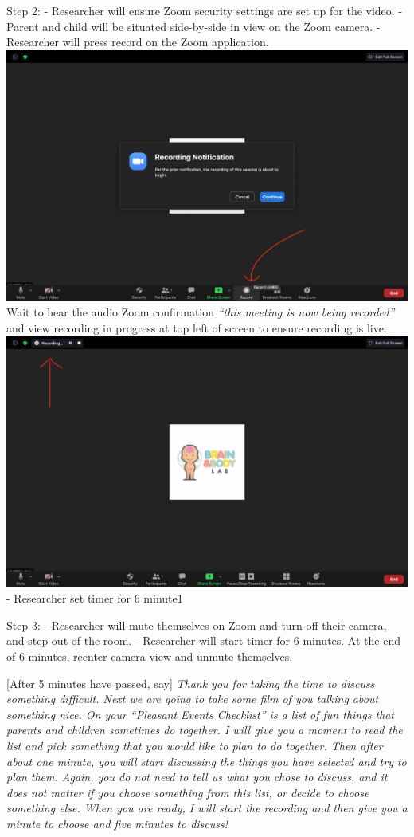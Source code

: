 \documentclass[]{book}
\begin{document}
Step 2:
- Researcher will ensure Zoom security settings are set up for the video.
- Parent and child will be situated side-by-side in view on the Zoom camera.
-Researcher will press record on the Zoom application. \includegraphics{images/zoom_parent_child_interaction/3.png} Wait to hear the audio Zoom confirmation \emph{``this meeting is now being recorded''} and view recording in progress at top left of screen to ensure recording is live. \includegraphics{images/zoom_parent_child_interaction/4.png}
- Researcher set timer for 6 minute1

Step 3:
- Researcher will mute themselves on Zoom and turn off their camera, and step out of the room.
- Researcher will start timer for 6 minutes. At the end of 6 minutes, reenter camera view and unmute themselves.

{[}After 5 minutes have passed, say{]} \emph{Thank you for taking the time to discuss something difficult. Next we are going to take some film of you talking about something nice. On your ``Pleasant Events Checklist'' is a list of fun things that parents and children sometimes do together. I will give you a moment to read the list and pick something that you would like to plan to do together. Then after about one minute, you will start discussing the things you have selected and try to plan them. Again, you do not need to tell us what you chose to discuss, and it does not matter if you choose something from this list, or decide to choose something else. When you are ready, I will start the recording and then give you a minute to choose and five minutes to discuss!}
\end{document}
